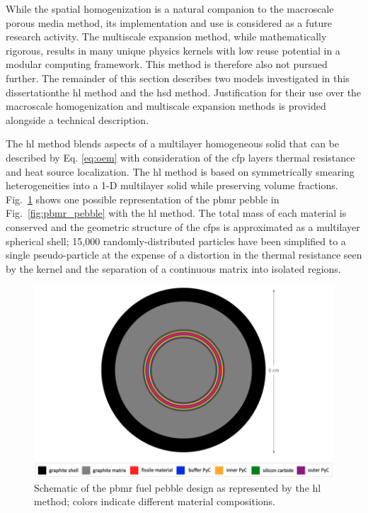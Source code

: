 While the spatial homogenization is a natural companion to the macroscale porous media method, its implementation and use is considered as a future research activity. The multiscale expansion method, while mathematically rigorous, results in many unique physics kernels with low reuse potential in a modular computing framework. This method is therefore also not pursued further. The remainder of this section describes two models investigated in this dissertation\mdash the \gls{hl} method and the \gls{hsd} method. Justification for their use over the macroscale homogenization and multiscale expansion methods is provided alongside a technical description.

The \gls{hl} method blends aspects of a multilayer homogeneous solid that can be described by Eq. \eqref{eq:oem} with consideration of the \gls{cfp} layers thermal resistance and heat source localization. The \gls{hl} method is based on symmetrically smearing heterogeneities into a 1-D multilayer solid while preserving volume fractions. Fig.\ \ref{fig:pbmr_hlm} shows one possible representation of the \gls{pbmr} pebble in Fig.\ \ref{fig:pbmr_pebble} with the \gls{hl} method. The total mass of each material is conserved and the geometric structure of the \glspl{cfp} is approximated as a multilayer spherical shell; 15,000 randomly-distributed particles have been simplified to a single pseudo-particle at the expense of a distortion in the thermal resistance seen by the kernel and the separation of a continuous matrix into isolated regions.

\begin{figure}[!h]
\centering
  \includegraphics[width=0.85\linewidth]{figs/pbmr_hlm.png}
\caption{Schematic of the \gls{pbmr} fuel pebble design as represented by the \gls{hl} method; colors indicate different material compositions.}
\label{fig:pbmr_hlm}
\end{figure}

